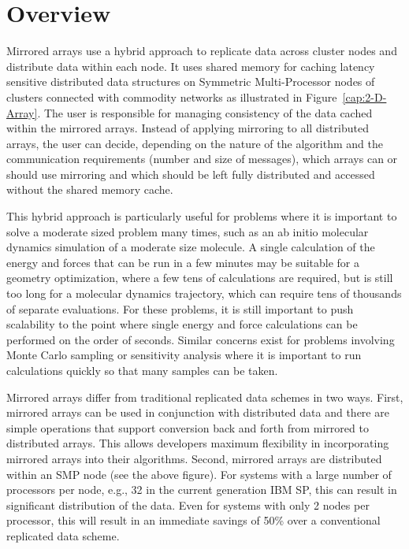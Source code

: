 
\section{Overview}

Mirrored arrays use a hybrid approach to replicate data across cluster
nodes and distribute data within each node. It uses shared memory
for caching latency sensitive distributed data structures on Symmetric
Multi-Processor nodes of clusters connected with commodity networks
as illustrated in Figure~\ref{cap:2-D-Array}. The user is responsible
for managing consistency of the data cached within the mirrored arrays.
Instead of applying mirroring to all distributed arrays, the user
can decide, depending on the nature of the algorithm and the communication
requirements (number and size of messages), which arrays can or should
use mirroring and which should be left fully distributed and accessed
without the shared memory cache. 

This hybrid approach is particularly useful for problems where it
is important to solve a moderate sized problem many times, such as
an ab initio molecular dynamics simulation of a moderate size molecule.
A single calculation of the energy and forces that can be run in a
few minutes may be suitable for a geometry optimization, where a few
tens of calculations are required, but is still too long for a molecular
dynamics trajectory, which can require tens of thousands of separate
evaluations. For these problems, it is still important to push scalability
to the point where single energy and force calculations can be performed
on the order of seconds. Similar concerns exist for problems involving
Monte Carlo sampling or sensitivity analysis where it is important
to run calculations quickly so that many samples can be taken.

Mirrored arrays differ from traditional replicated data schemes in
two ways. First, mirrored arrays can be used in conjunction with distributed
data and there are simple operations that support conversion back
and forth from mirrored to distributed arrays. This allows developers
maximum flexibility in incorporating mirrored arrays into their algorithms.
Second, mirrored arrays are distributed within an SMP node (see the
above figure). For systems with a large number of processors per node,
e.g., 32 in the current generation IBM SP, this can result in significant
distribution of the data. Even for systems with only 2 nodes per processor,
this will result in an immediate savings of 50\% over a conventional
replicated data scheme.

